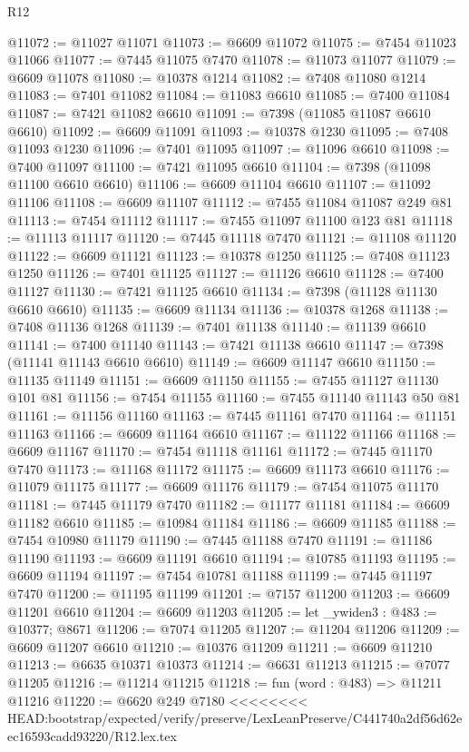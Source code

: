 \begin{lexlean}{R12}
\begin{coremodule}
{{{{{{{{{{{{{{{{{{{{{{{{{{{{{{{{{{{{{{{{{{{{{{{{{{{{{{{{{{{{{{{{{{{{{{{{{{{{{{{{{{@11072 := @11027 @11071
@11073 := @6609 @11072
@11075 := @7454 @11023 @11066
@11077 := @7445 @11075 @7470
@11078 := @11073 @11077
@11079 := @6609 @11078
@11080 := @10378 @1214
@11082 := @7408 @11080 @1214
@11083 := @7401 @11082
@11084 := @11083 @6610
@11085 := @7400 @11084
@11087 := @7421 @11082 @6610
@11091 := @7398 (@11085 @11087 @6610 @6610)
@11092 := @6609 @11091
@11093 := @10378 @1230
@11095 := @7408 @11093 @1230
@11096 := @7401 @11095
@11097 := @11096 @6610
@11098 := @7400 @11097
@11100 := @7421 @11095 @6610
@11104 := @7398 (@11098 @11100 @6610 @6610)
@11106 := @6609 @11104 @6610
@11107 := @11092 @11106
@11108 := @6609 @11107
@11112 := @7455 @11084 @11087 @249 @81
@11113 := @7454 @11112
@11117 := @7455 @11097 @11100 @123 @81
@11118 := @11113 @11117
@11120 := @7445 @11118 @7470
@11121 := @11108 @11120
@11122 := @6609 @11121
@11123 := @10378 @1250
@11125 := @7408 @11123 @1250
@11126 := @7401 @11125
@11127 := @11126 @6610
@11128 := @7400 @11127
@11130 := @7421 @11125 @6610
@11134 := @7398 (@11128 @11130 @6610 @6610)
@11135 := @6609 @11134
@11136 := @10378 @1268
@11138 := @7408 @11136 @1268
@11139 := @7401 @11138
@11140 := @11139 @6610
@11141 := @7400 @11140
@11143 := @7421 @11138 @6610
@11147 := @7398 (@11141 @11143 @6610 @6610)
@11149 := @6609 @11147 @6610
@11150 := @11135 @11149
@11151 := @6609 @11150
@11155 := @7455 @11127 @11130 @101 @81
@11156 := @7454 @11155
@11160 := @7455 @11140 @11143 @50 @81
@11161 := @11156 @11160
@11163 := @7445 @11161 @7470
@11164 := @11151 @11163
@11166 := @6609 @11164 @6610
@11167 := @11122 @11166
@11168 := @6609 @11167
@11170 := @7454 @11118 @11161
@11172 := @7445 @11170 @7470
@11173 := @11168 @11172
@11175 := @6609 @11173 @6610
@11176 := @11079 @11175
@11177 := @6609 @11176
@11179 := @7454 @11075 @11170
@11181 := @7445 @11179 @7470
@11182 := @11177 @11181
@11184 := @6609 @11182 @6610
@11185 := @10984 @11184
@11186 := @6609 @11185
@11188 := @7454 @10980 @11179
@11190 := @7445 @11188 @7470
@11191 := @11186 @11190
@11193 := @6609 @11191 @6610
@11194 := @10785 @11193
@11195 := @6609 @11194
@11197 := @7454 @10781 @11188
@11199 := @7445 @11197 @7470
@11200 := @11195 @11199
@11201 := @7157 @11200
@11203 := @6609 @11201 @6610
@11204 := @6609 @11203
@11205 := let _ywiden3 : @483 := @10377; @8671
@11206 := @7074 @11205
@11207 := @11204 @11206
@11209 := @6609 @11207 @6610
@11210 := @10376 @11209
@11211 := @6609 @11210
@11213 := @6635 @10371 @10373
@11214 := @6631 @11213
@11215 := @7077 @11205
@11216 := @11214 @11215
@11218 := fun (word : @483) => @11211 @11216
@11220 := @6620 @249 @7180
<<<<<<<< HEAD:bootstrap/expected/verify/preserve/LexLeanPreserve/C441740a2df56d62eec16593cadd93220/R12.lex.tex
}}}}}}}}}}}}}}}}}}}}}}}}}}}}}}}}}}}}}}}}}}}}}}}}}}}}}}}}}}}}}}}}}}}}}}}}}}}}}}}}}}
\end{coremodule}
\end{lexlean}
